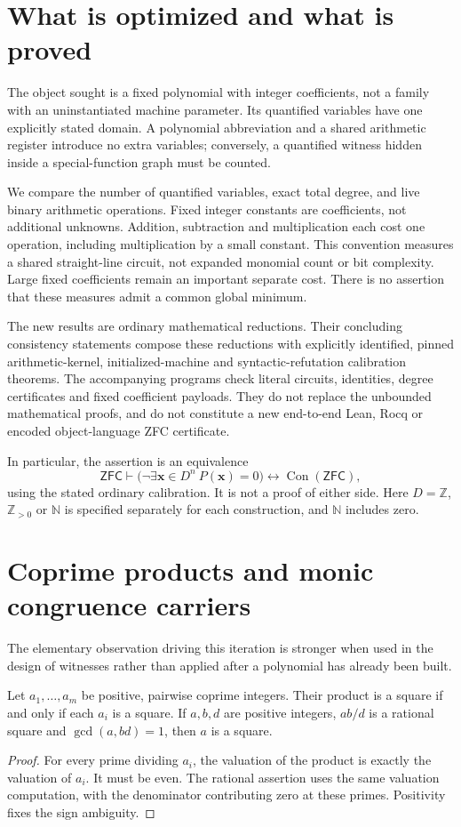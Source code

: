 \section{What is optimized and what is proved}
The object sought is a fixed polynomial with integer coefficients, not a
family with an uninstantiated machine parameter. Its quantified variables
have one explicitly stated domain. A polynomial abbreviation and a shared
arithmetic register introduce no extra variables; conversely, a quantified
witness hidden inside a special-function graph must be counted.

We compare the number of quantified variables, exact total degree, and
live binary arithmetic operations. Fixed integer constants are coefficients,
not additional unknowns. Addition, subtraction and multiplication each cost
one operation, including multiplication by a small constant. This convention
measures a shared straight-line circuit, not expanded monomial count or bit
complexity. Large fixed coefficients remain an important separate cost.
There is no assertion that these measures admit a common global minimum.

The new results are ordinary mathematical reductions. Their concluding
consistency statements compose these reductions with explicitly identified,
pinned arithmetic-kernel, initialized-machine and syntactic-refutation
calibration theorems. The accompanying programs check literal circuits,
identities, degree certificates and fixed coefficient payloads. They do not
replace the unbounded mathematical proofs, and do not constitute a new
end-to-end Lean, Rocq or encoded object-language ZFC certificate.

In particular, the assertion is an equivalence
\[
 \mathsf{ZFC}\vdash
 \bigl(\neg\exists\mathbf x\in D^n\ P(\mathbf x)=0\bigr)
 \longleftrightarrow\operatorname{Con}(\mathsf{ZFC}),
\]
using the stated ordinary calibration. It is not a proof of either side.
Here $D=\mathbb Z$, $\mathbb Z_{>0}$ or $\mathbb N$ is specified separately
for each construction, and $\mathbb N$ includes zero.

\section{Coprime products and monic congruence carriers}
The elementary observation driving this iteration is stronger when used
in the design of witnesses rather than applied after a polynomial has
already been built.

\begin{lemma}
Let $a_1,\ldots,a_m$ be positive, pairwise coprime integers. Their product
is a square if and only if each $a_i$ is a square. If $a,b,d$ are positive integers, $ab/d$ is a rational square and
$\gcd(a,bd)=1$, then $a$ is a square.
\end{lemma}
\begin{proof}
For every prime dividing $a_i$, the valuation of the product is exactly
the valuation of $a_i$. It must be even. The rational assertion uses the
same valuation computation, with the denominator contributing zero at
these primes. Positivity fixes the sign ambiguity.
\end{proof}

